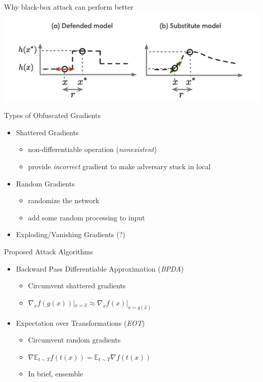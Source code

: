 \documentclass{beamer}
\begin{document}
\begin{frame}{Why black-box attack can perform better}
  \includegraphics[width=\textwidth]{fig/ob-grad/black-box-attack.png}
\end{frame}

\begin{frame}{Types of Obfuscated Gradients}
  \begin{itemize}
    \item Shattered Gradients 
      \begin{itemize}
        \item non-differentiable operation (\textit{nonexistent})
        \item provide \textit{incorrect} gradient to make adversary stuck in local
      \end{itemize}
    \item Random Gradients
        \begin{itemize}
          \item randomize the network
          \item add some random processing to input
        \end{itemize}
      \item Exploding/Vanishing Gradients (?)
  \end{itemize}
\end{frame}

\begin{frame}{Proposed Attack Algorithms}
  \begin{itemize}
    \item Backward Pass Differentiable Approximation (\textit{BPDA})
      \begin{itemize}
        \item Circumvent shattered gradients
        \item $\nabla_xf(g(x))|_{x = \hat{x}} \approx \nabla_xf(x)|_{x = g(\hat{x})}$
      \end{itemize}

    \item Expectation over Transformations (\textit{EOT})
      \begin{itemize}
        \item Circumvent random gradients
        \item $\nabla\mathbb{E}_{t \sim T}f(t(x)) = \mathbb{E}_{t \sim T} \nabla f(t(x))$
        \item In brief, ensemble
      \end{itemize}
  \end{itemize}
\end{frame}
\end{document}

